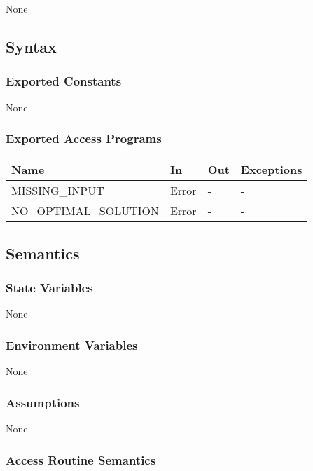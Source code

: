\documentclass[12pt, titlepage]{article}
\begin{document}
None

\subsection{Syntax}

\subsubsection{Exported Constants}

None

\subsubsection{Exported Access Programs}

\begin{center}
	\begin{tabular}{p{6cm} p{4cm} p{3cm} p{3cm}}
		\hline
		\textbf{Name} & \textbf{In} & \textbf{Out} & \textbf{Exceptions} \\
		\hline
		MISSING\_INPUT & Error & - & - \\
		NO\_OPTIMAL\_SOLUTION & Error & - & - \\
		\hline
	\end{tabular}
\end{center}

\subsection{Semantics}

\subsubsection{State Variables}

None

\subsubsection{Environment Variables}

None

\subsubsection{Assumptions}

None

\subsubsection{Access Routine Semantics}
\end{document}
